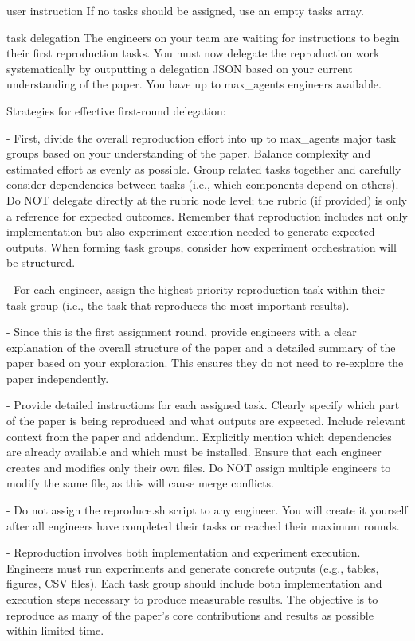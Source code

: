 \begin{promptbox}{user instruction}
If no tasks should be assigned, use an empty tasks array.
\end{promptbox}

\begin{promptbox}{task delegation}
The engineers on your team are waiting for instructions to begin their first reproduction tasks. You must now delegate the reproduction work systematically by outputting a delegation JSON based on your current understanding of the paper. You have up to {max_agents} engineers available.

Strategies for effective first-round delegation:

- First, divide the overall reproduction effort into up to {max_agents} major task groups based on your understanding of the paper. Balance complexity and estimated effort as evenly as possible. Group related tasks together and carefully consider dependencies between tasks (i.e., which components depend on others). Do NOT delegate directly at the rubric node level; the rubric (if provided) is only a reference for expected outcomes. Remember that reproduction includes not only implementation but also experiment execution needed to generate expected outputs. When forming task groups, consider how experiment orchestration will be structured.

- For each engineer, assign the highest-priority reproduction task within their task group (i.e., the task that reproduces the most important results).

- Since this is the first assignment round, provide engineers with a clear explanation of the overall structure of the paper and a detailed summary of the paper based on your exploration. This ensures they do not need to re-explore the paper independently.

- Provide detailed instructions for each assigned task. Clearly specify which part of the paper is being reproduced and what outputs are expected. Include relevant context from the paper and addendum. Explicitly mention which dependencies are already available and which must be installed. Ensure that each engineer creates and modifies only their own files. Do NOT assign multiple engineers to modify the same file, as this will cause merge conflicts.

- Do not assign the reproduce.sh script to any engineer. You will create it yourself after all engineers have completed their tasks or reached their maximum rounds.

- Reproduction involves both implementation and experiment execution. Engineers must run experiments and generate concrete outputs (e.g., tables, figures, CSV files). Each task group should include both implementation and execution steps necessary to produce measurable results. The objective is to reproduce as many of the paper's core contributions and results as possible within limited time.


\end{promptbox}

